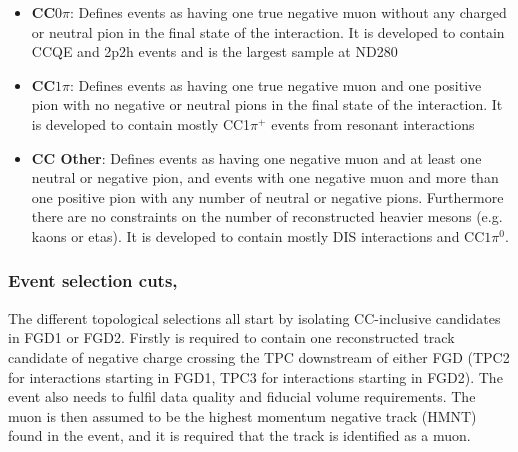 
\begin{itemize}
\item \textbf{CC$0\pi$}: Defines events as having one true negative muon without any charged or neutral pion in the final state of the interaction. It is developed to contain CCQE and 2p2h events and is the largest sample at ND280 

\item \textbf{CC$1\pi$}: Defines events as having one true negative muon and one positive pion with no negative or neutral pions in the final state of the interaction. It is developed to contain mostly CC1$\pi^{+}$ events from resonant interactions

\item \textbf{CC Other}: Defines events as having one negative muon and at least one neutral or negative pion, and events with one negative muon and more than one positive pion with any number of neutral or negative pions. Furthermore there are no constraints on the number of reconstructed heavier mesons (e.g. kaons or etas). It is developed to contain mostly DIS interactions and CC$1\pi^0$.
\end{itemize}

\subsubsection{Event selection cuts, \numu}
\label{sec:numu_sel}
The different topological selections all start by isolating CC-inclusive candidates in FGD1 or FGD2. Firstly is required to contain one reconstructed track candidate of negative charge crossing the TPC downstream of either FGD (TPC2 for interactions starting in FGD1, TPC3 for interactions starting in FGD2). The event also needs to fulfil data quality and fiducial volume requirements. The muon is then assumed to be the highest momentum negative track (HMNT) found in the event, and it is required that the track is identified as a muon.


